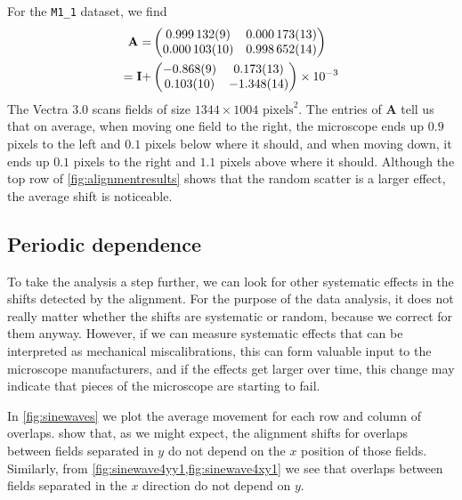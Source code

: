 \documentclass{article}
\newcommand{\matrixbold}[1]{\mathbf{#1}}
\newcommand{\M}[2]{\texttt{M#1\_#2}}
\begin{document}
For the \M11 dataset, we find
\begin{align}
\matrixbold{A}=&\begin{pmatrix}
\num{0.999132\pm.000009} &
\num{.000173\pm.000013} \\
\num{0.000103\pm.000010} &
\num{0.998652\pm.000014}
\end{pmatrix} \\
=\matrixbold{I} + &\begin{pmatrix}
\num{-0.868\pm.009} &
\num{.173\pm.013} \\
\num{0.103\pm.010} &
\num{-1.348\pm.014}
\end{pmatrix} \times \num{e-3}
\label{eq:Amatrix_M11}
\end{align}
The Vectra 3.0 scans fields of size $1344\times1004$ $\text{pixels}^2$.  The entries of $\matrixbold{A}$ tell us that on average, when moving one field to the right, the microscope ends up $0.9$ pixels to the left and $0.1$ pixels below where it should, and when moving down, it ends up $0.1$ pixels to the right and $1.1$ pixels above where it should.  Although the top row of \cref{fig:alignmentresults} shows that the random scatter is a larger effect, the average shift is noticeable.

\subsection{Periodic dependence}
\label{sec:vectraperiodic}

To take the analysis a step further, we can look for other systematic effects in the shifts detected by the alignment.  For the purpose of the data analysis, it does not really matter whether the shifts are systematic or random, because we correct for them anyway.  However, if we can measure systematic effects that can be interpreted as mechanical miscalibrations, this can form valuable input to the microscope manufacturers, and if the effects get larger over time, this change may indicate that pieces of the microscope are starting to fail.

In \cref{fig:sinewaves} we plot the average movement for each row and column of overlaps.   show that, as we might expect, the alignment shifts for overlaps between fields separated in $y$ do not depend on the $x$ position of those fields.  Similarly, from \cref{fig:sinewave4yy1,fig:sinewave4xy1} we see that overlaps between fields separated in the $x$ direction do not depend on $y$.
\end{document}
